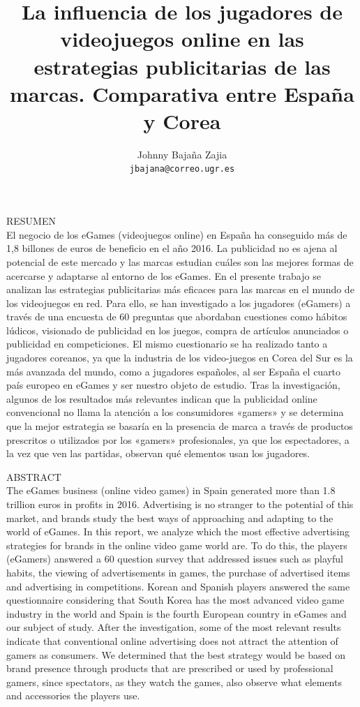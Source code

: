\documentclass[a4paper,11pt]{article}
\title{La influencia de los jugadores de videojuegos online en las estrategias publicitarias de las marcas. Comparativa entre España y Corea}
\author{\LARGE Johnny Bajaña Zajia\\ \texttt{jbajana@correo.ugr.es}}
\begin{document}
\maketitle 

RESUMEN\\
El negocio de los eGames (videojuegos online) en España ha conseguido más de 1,8 billones de euros de beneficio en el año 2016. La publicidad no es ajena al potencial de este mercado y las marcas estudian cuáles son las mejores formas de acercarse y adaptarse al entorno de los eGames. En el presente trabajo se analizan las estrategias publicitarias más eficaces para las marcas en el mundo de los videojuegos en red. Para ello, se han investigado a los jugadores (eGamers) a través de una encuesta de 60 preguntas que abordaban cuestiones como hábitos lúdicos, visionado de publicidad en los juegos, compra de artículos anunciados o publicidad en competiciones. El mismo cuestionario se ha realizado tanto a jugadores coreanos, ya que la industria de los video-juegos en Corea del Sur es la más avanzada del mundo, como a jugadores españoles, al ser España el cuarto país europeo en eGames y ser nuestro objeto de estudio. Tras la investigación, algunos de los resultados más relevantes indican que la publicidad online convencional no llama la atención a los consumidores «gamers» y se determina que la mejor estrategia se basaría en la presencia de marca a través de productos prescritos o utilizados por los «gamers» profesionales, ya que los espectadores, a la vez que ven las partidas, observan qué elementos usan los jugadores.

ABSTRACT\\
The eGames business (online video games) in Spain generated more than 1.8 trillion euros in profits in 2016. Advertising is no stranger to the potential of this market, and brands study the best ways of approaching and adapting to the world of eGames. In this report, we analyze which the most effective advertising strategies for brands in the online video game world are. To do this, the players (eGamers) answered a 60 question survey that addressed issues such as playful habits, the viewing of advertisements in games, the purchase of advertised items and advertising in competitions. Korean and Spanish players answered the same questionnaire considering that South Korea has the most advanced video game industry in the world and Spain is the fourth European country in eGames and our subject of study. After the investigation, some of the most relevant results indicate that conventional online advertising does not attract the attention of gamers as consumers. We determined that the best strategy would be based on brand presence through products that are prescribed or used by professional gamers, since spectators, as they watch the games, also observe what elements and accessories the players use.
\end{document}
